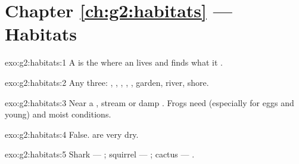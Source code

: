 \section*{Chapter \ref{ch:g2:habitats} --- Habitats}

\begin{solution}{exo:g2:habitats:1}
A  is the  where an  lives and finds what it
.
\end{solution}

\begin{solution}{exo:g2:habitats:2}
Any three: , , , , , garden, river,
shore.
\end{solution}

\begin{solution}{exo:g2:habitats:3}
Near a , stream or damp . Frogs need  (especially for
eggs and young) and moist conditions.
\end{solution}

\begin{solution}{exo:g2:habitats:4}
False.  are very dry.
\end{solution}

\begin{solution}{exo:g2:habitats:5}
Shark --- ; squirrel --- ; cactus --- .
\end{solution}

